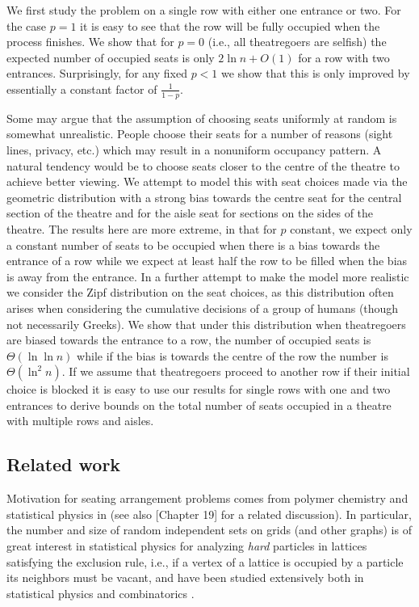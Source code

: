 \documentclass[11pt]{llncs}
\begin{document}
We first study the problem on
a single row with either one entrance or two.
For the case $p=1$ it is easy to see that the row will be fully occupied when
the process finishes. We show that for $p=0$ (i.e., all theatregoers are selfish)
the expected number of occupied seats is only $2 \ln n + O(1)$ 
for a row with
two entrances. Surprisingly, for any fixed $p<1$ we show that this is only 
improved by essentially a constant factor of $\frac{1}{1-p}$. 

Some may
argue that the assumption of choosing seats uniformly at random is somewhat
unrealistic. People choose their seats for a number of reasons (sight lines, privacy, etc.)
which may  result in a nonuniform occupancy pattern. A natural tendency would be to 
choose seats closer to the centre of the theatre to achieve better viewing. We
attempt to model this with seat choices made via the geometric distribution
with a strong bias towards the centre seat for the central section of the theatre
and for the aisle seat for sections on the sides of the theatre. The results
here are more extreme, in that for $p$ constant, we expect only a constant number
of seats to be occupied when there is a bias towards the entrance of a row while we expect
at least half the row to be filled when the bias is away from the entrance.
In a further
attempt to make the model more realistic we consider  the Zipf distribution on the seat choices, as this 
distribution often arises when considering the cumulative decisions of a
group of humans (though not necessarily Greeks)\cite{zipf}. We show that under this distribution
when theatregoers
are biased towards the entrance to a row, the number of occupied seats is
$\Theta(\ln \ln n)$ while if the bias is towards the centre of the row the number
is $\Theta(\ln^2 n)$.
If we assume that theatregoers proceed to another row if their initial choice
is blocked it is easy to
use our results for single rows with one and two entrances to derive bounds
on the total number of seats occupied in a theatre with multiple rows and aisles. 


\subsection{Related work}

Motivation for seating arrangement problems
comes from polymer chemistry and statistical physics in
\cite{flory1939intramolecular,olson1978markov} (see also \cite{strogatz2012joy}[Chapter 19]
for a related discussion).
In particular, the number and size of random independent sets 
on grids (and other graphs) is of great interest in
statistical physics for analyzing {\it hard} particles in lattices
satisfying the exclusion rule, i.e., if a vertex of a lattice is 
occupied by a particle its neighbors must be vacant, and 
have been studied
extensively both in statistical physics and combinatorics 
\cite{baxter,hard1,hard2,calkin-wilf,finch}.
\end{document}
